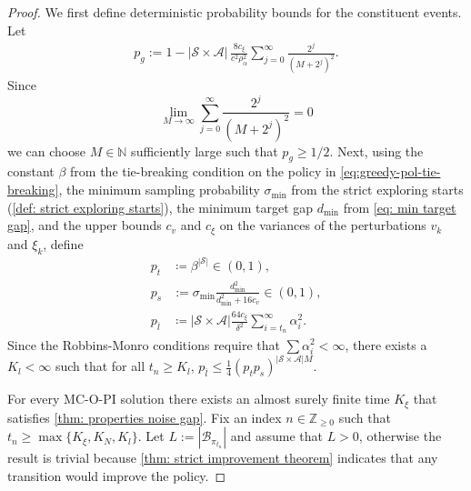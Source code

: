 \begin{proof}
We first define deterministic probability bounds for the constituent events. Let
\begin{align}
p_g
:=
1-|\mathcal S\times\mathcal A|\,
\frac{8 c_\xi}{c^2\rho_\alpha^2}
\sum_{j=0}^{\infty}\frac{2^j}{(M+2^j)^2} .
\end{align}
Since
\[
\lim_{M \to \infty} \sum_{j = 0}^{\infty} \frac{2^j}{(M+2^j)^2} = 0
\]
we can choose $M \in \mathbb N$ sufficiently large such that $p_g \ge 1/2$.
Next, 
using the constant $\beta$ from the tie-breaking condition on the policy in \eqref{eq:greedy-pol-tie-breaking},
the minimum sampling probability $\sigma_{\min}$ from the strict exploring starts (\autoref{def: strict exploring starts}),
the minimum target gap $d_{\min}$ from \eqref{eq: min target gap},
and the upper bounds $c_v$ and $c_\xi$ on the variances of the perturbations $v_k$ and $\xi_k$,
define
\begin{align}
p_t &\coloneqq \beta^{|\mathcal S| } \in (0,1) ,
\\
p_s &:= \sigma_{\min} \frac{d_{\min}^2}{d_{\min}^2 + 16 c_v} \in (0,1) ,
\\
p_{\overline l} &\coloneqq 
|\mathcal S\times\mathcal A|
\frac{64 c_\xi}{\delta^2}\sum_{i=t_n}^\infty \alpha_i^2 .
\end{align}
Since the Robbins-Monro conditions require that \(\sum \alpha_i^2<\infty\), there exists a \(K_l<\infty\) such that for all \(t_n \ge K_l\), $p_{\overline l} \le \frac14 ( p_t p_s ) ^{|\mathcal S\times\mathcal A| M}$.


For every MC-O-PI solution there exists an almost surely finite time $K_\xi$ that satisfies \autoref{thm: properties noise gap}.
Fix an index $n \in \mathbb Z_{\ge 0}$ such that $t_n \ge \max\{K_\xi, K_N, K_l\}$.
Let $L := |\mathcal B_{\pi_{t_n}}|$ and assume that $L>0$, otherwise the result is trivial because \autoref{thm: strict improvement theorem} indicates that any transition would improve the policy.



\end{proof}
